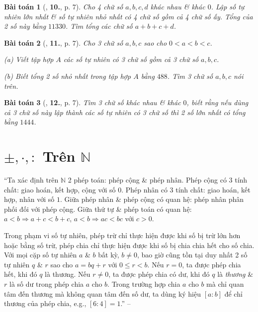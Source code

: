 \documentclass{article}
\numberwithin{equation}{section}
\newtheorem{baitoan}{Bài toán}
\begin{document}
\begin{baitoan}[\cite{Binh_Toan_6_tap_1}, \textbf{10.}, p. 7]
	Cho 4 chữ số $a,b,c,d$ khác nhau \& khác $0$. Lập số tự nhiên lớn nhất \& số tự nhiên nhỏ nhất có 4 chữ số gồm cả 4 chữ số ấy. Tổng của 2 số này bằng $11330$. Tìm tổng các chữ số $a + b + c + d$.
\end{baitoan}

\begin{baitoan}[\cite{Binh_Toan_6_tap_1}, \textbf{11.}, p. 7]
	Cho 3 chữ số $a,b,c$ sao cho $0 < a < b < c$.
	\begin{enumerate*}
		\item[(a)] Viết tập hợp $A$ các số tự nhiên có 3 chữ số gồm cả 3 chữ số $a,b,c$.
		\item[(b)] Biết tổng 2 số nhỏ nhất trong tập hợp $A$ bằng $488$. Tìm 3 chữ số $a,b,c$ nói trên.
	\end{enumerate*}
\end{baitoan}

\begin{baitoan}[\cite{Binh_Toan_6_tap_1}, \textbf{12.}, p. 7]
	Tìm 3 chữ số khác nhau \& khác $0$, biết rằng nếu dùng cả 3 chữ số này lập thành các số tự nhiên có 3 chữ số thì 2 số lớn nhất có tổng bằng $1444$.
\end{baitoan}


\section{$\pm,\cdot,:$ Trên $\mathbb{N}$}
``Ta xác định trên $\mathbb{N}$ 2 phép toán: phép cộng \& phép nhân. Phép cộng có 3 tính chất: giao hoán, kết hợp, cộng với số $0$. Phép nhân có 3 tính chất: giao hoán, kết hợp, nhân với số $1$. Giữa phép nhân \& phép cộng có quan hệ: phép nhân phân phối đối với phép cộng. Giữa thứ tự \& phép toán có quan hệ: $a < b\Rightarrow a + c < b + c$, $a < b\Rightarrow ac < bc$ với $c > 0$.

Trong phạm vi số tự nhiên, phép trừ chỉ thực hiện được khi số bị trừ lớn hơn hoặc bằng số trừ, phép chia chỉ thực hiện được khi số bị chia chia hết cho số chia. Với mọi cặp số tự nhiên $a$ \& $b$ bất kỳ, $b\ne 0$, bao giờ cũng tồn tại duy nhất 2 số tự nhiên $q$ \& $r$ sao cho $a = bq + r$ với $0\le r < b$. Nếu $r = 0$, ta được phép chia hết, khi đó $q$ là thương. Nếu $r\ne0$, ta được phép chia có dư, khi đó $q$ là \textit{thương} \& $r$ là số dư trong phép chia $a$ cho $b$. Trong trường hợp chia $a$ cho $b$ mà chỉ quan tâm đến thương mà không quan tâm đến số dư, ta dùng ký hiệu $[a:b]$ để chỉ thương của phép chia, e.g., $[6:4] = 1$.'' -- \cite[\S2, p. 7]{Binh_Toan_6_tap_1}
\end{document}
